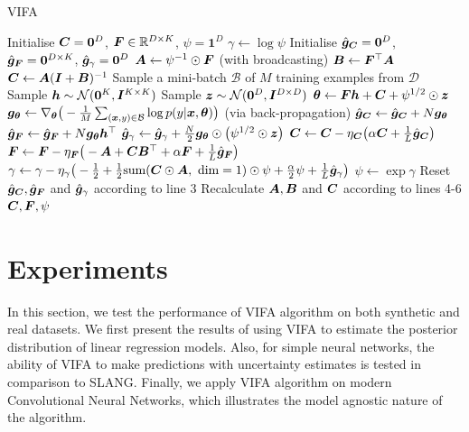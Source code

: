 \documentclass[10pt]{article} %
\begin{document}
\begin{algorithm}[!htbp] 
	\caption{VIFA}
	\label{alg:vi_fa}
	\begin{algorithmic}[1]
		\State Initialise ${\bm{C}} = \bm{0}^D$, ${\bm{F}} \in \mathbb{R}^{D \times K}$, $\psi = \bm{1}^D$
		\State $\gamma \leftarrow \log \psi$
		\State Initialise $\hat{{\bm{g}}}_{\bm{C}} = \bm{0}^D$, $\hat{{\bm{g}}}_{\bm{F}} = \bm{0}^{D \times K}$, $\hat{{\bm{g}}}_\gamma = \bm{0}^D$
		\State ${\bm{A}} \leftarrow \psi^{-1} \odot {\bm{F}}$ (with broadcasting)
		\State ${\bm{B}} \leftarrow {\bm{F}}^\top {\bm{A}}$
		\State ${\bm{C}} \leftarrow {\bm{A}} ({\bm{I}} + {\bm{B}})^{-1}$
			\State Sample a mini-batch $\mathcal{B}$ of $M$ training examples from $\mathcal{D}$
			\State Sample ${\bm{h}} \sim \mathcal{N}(\bm{0}^K, {\bm{I}}^{K \times K})$
			\State Sample ${\bm{z}} \sim \mathcal{N}(\bm{0}^D, {\bm{I}}^{D \times D})$
			\State ${\bm{\theta}} \leftarrow {\bm{F}} {\bm{h}} + {\bm{C}} + \psi^{1/2} \odot {\bm{z}}$
			\State ${\bm{g}}_{\bm{\theta}} \leftarrow \nabla_{\bm{\theta}} \big(-\frac{1}{M} \sum_{({\bm{x}}, y) \in \mathcal{B}} \log p(y | {\bm{x}}, {\bm{\theta}})\big)$ 
			(via back-propagation)
			\State $\hat{{\bm{g}}}_{\bm{C}} \leftarrow \hat{{\bm{g}}}_{\bm{C}} + N {\bm{g}}_{\bm{\theta}}$
			\State $\hat{{\bm{g}}}_{\bm{F}} \leftarrow \hat{{\bm{g}}}_{\bm{F}} + N {\bm{g}}_{\bm{\theta}} {\bm{h}}^\top$
			\State $\hat{{\bm{g}}}_\gamma \leftarrow \hat{{\bm{g}}}_\gamma + \frac{N}{2} {\bm{g}}_{\bm{\theta}} \odot \big(\psi^{1/2} \odot {\bm{z}}\big)$
				\State ${\bm{C}} \leftarrow {\bm{C}} - \eta_{\bm{C}} \big(\alpha {\bm{C}} + \frac{1}{L}\hat{{\bm{g}}}_{\bm{C}}\big)$
				\State ${\bm{F}} \leftarrow {\bm{F}} - \eta_{\bm{F}} \big(-{\bm{A}}  + {\bm{C}} {\bm{B}}^\top+ \alpha {\bm{F}} +\frac{1}{L}\hat{{\bm{g}}}_{\bm{F}}\big)$
				\State $\gamma \leftarrow \gamma - \eta_\gamma \big(-\frac{1}{2} + \frac{1}{2} \text{sum}({\bm{C}} \odot {\bm{A}}, \text{ dim} = 1) \odot \psi +\frac{\alpha}{2} \psi  + \frac{1}{L}\hat{{\bm{g}}}_\gamma\big)$
				\State $\psi \leftarrow \exp \gamma$
				\State Reset $\hat{{\bm{g}}}_{\bm{C}}, \hat{{\bm{g}}}_{\bm{F}}$ and $\hat{{\bm{g}}}_\gamma$ according to line 3
				\State Recalculate ${\bm{A}}, {\bm{B}}$ and ${\bm{C}}$ according to lines 4-6
			\EndIf
		\EndFor
	\State \Return ${\bm{C}}, {\bm{F}}, \psi$
	\end{algorithmic}
\end{algorithm}

\section{Experiments}
In this section, we test the performance of VIFA algorithm on both synthetic and real datasets. We first present the results of using VIFA to estimate the posterior distribution of linear regression models. Also, for simple neural networks, the ability of VIFA to make predictions with uncertainty estimates is tested in comparison to SLANG. Finally, we apply VIFA algorithm on modern Convolutional Neural Networks, which illustrates the model agnostic nature of the algorithm.
\end{document}
